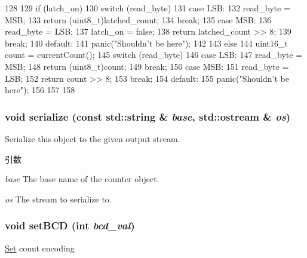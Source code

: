 \begin{DoxyCode}
128 {
129     if (latch_on) {
130         switch (read_byte) {
131           case LSB:
132             read_byte = MSB;
133             return (uint8_t)latched_count;
134             break;
135           case MSB:
136             read_byte = LSB;
137             latch_on = false;
138             return latched_count >> 8;
139             break;
140           default:
141             panic("Shouldn't be here");
142         }
143     } else {
144         uint16_t count = currentCount();
145         switch (read_byte) {
146           case LSB:
147             read_byte = MSB;
148             return (uint8_t)count;
149             break;
150           case MSB:
151             read_byte = LSB;
152             return count >> 8;
153             break;
154           default:
155             panic("Shouldn't be here");
156         }
157     }
158 }
\end{DoxyCode}
\hypertarget{classIntel8254Timer_1_1Counter_ab4138b21b48e3371a8e20df72b675a88}{
\subsubsection[{serialize}]{\setlength{\rightskip}{0pt plus 5cm}void serialize (const std::string \& {\em base}, \/  std::ostream \& {\em os})}}
\label{classIntel8254Timer_1_1Counter_ab4138b21b48e3371a8e20df72b675a88}
Serialize this object to the given output stream. 
\begin{DoxyParams}{引数}
\item[{\em base}]The base name of the counter object. \item[{\em os}]The stream to serialize to. \end{DoxyParams}
\hypertarget{classIntel8254Timer_1_1Counter_a2797b27bd7f8ace4f14e8f3106547be9}{
\subsubsection[{setBCD}]{\setlength{\rightskip}{0pt plus 5cm}void setBCD (int {\em bcd\_\-val})}}
\label{classIntel8254Timer_1_1Counter_a2797b27bd7f8ace4f14e8f3106547be9}
\hyperlink{classSet}{Set} count encoding 



